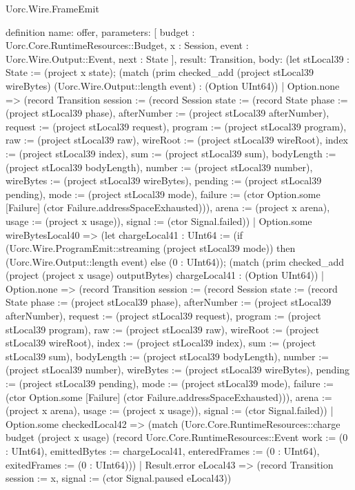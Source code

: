 \begin{lexlean}{Uorc.Wire.FrameEmit}
\begin{semanticmodule}
definition{
  name: offer,
  parameters: [
    budget : Uorc.Core.RuntimeResources::Budget,
    x : Session,
    event : Uorc.Wire.Output::Event,
    next : State
  ],
  result: Transition,
  body: (let stLocal39 : State := (project x state); (match (prim checked_add (project stLocal39 wireBytes) (Uorc.Wire.Output::length event) : (Option UInt64))
    | Option.none => (record Transition {session := (record Session {state := (record State {phase := (project stLocal39 phase), afterNumber := (project stLocal39 afterNumber), request := (project stLocal39 request), program := (project stLocal39 program), raw := (project stLocal39 raw), wireRoot := (project stLocal39 wireRoot), index := (project stLocal39 index), sum := (project stLocal39 sum), bodyLength := (project stLocal39 bodyLength), number := (project stLocal39 number), wireBytes := (project stLocal39 wireBytes), pending := (project stLocal39 pending), mode := (project stLocal39 mode), failure := (ctor Option.some [Failure] (ctor Failure.addressSpaceExhausted))}), arena := (project x arena), usage := (project x usage)}), signal := (ctor Signal.failed)})
    | Option.some wireBytesLocal40 => (let chargeLocal41 : UInt64 := (if (Uorc.Wire.ProgramEmit::streaming (project stLocal39 mode)) then (Uorc.Wire.Output::length event) else (0 : UInt64)); (match (prim checked_add (project (project x usage) outputBytes) chargeLocal41 : (Option UInt64))
      | Option.none => (record Transition {session := (record Session {state := (record State {phase := (project stLocal39 phase), afterNumber := (project stLocal39 afterNumber), request := (project stLocal39 request), program := (project stLocal39 program), raw := (project stLocal39 raw), wireRoot := (project stLocal39 wireRoot), index := (project stLocal39 index), sum := (project stLocal39 sum), bodyLength := (project stLocal39 bodyLength), number := (project stLocal39 number), wireBytes := (project stLocal39 wireBytes), pending := (project stLocal39 pending), mode := (project stLocal39 mode), failure := (ctor Option.some [Failure] (ctor Failure.addressSpaceExhausted))}), arena := (project x arena), usage := (project x usage)}), signal := (ctor Signal.failed)})
      | Option.some checkedLocal42 => (match (Uorc.Core.RuntimeResources::charge budget (project x usage) (record Uorc.Core.RuntimeResources::Event {work := (0 : UInt64), emittedBytes := chargeLocal41, enteredFrames := (0 : UInt64), exitedFrames := (0 : UInt64)}))
        | Result.error eLocal43 => (record Transition {session := x, signal := (ctor Signal.paused eLocal43)})
}
\end{semanticmodule}
\end{lexlean}
